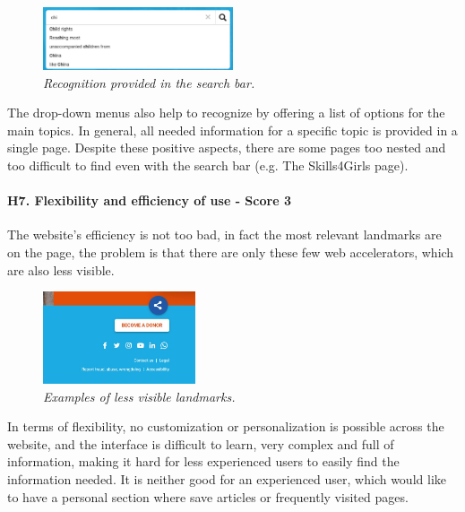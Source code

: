 \begin{figure}[!h]
	\begin{center}
		\includegraphics[width=0.5\textwidth]{FinalScores12.jpg}
		\captionsetup{font=small}
		\caption{\textit{Recognition provided in the search bar.}}
	\end{center}
\end{figure}
\newline The drop-down menus also help to recognize by offering a list of options for the main topics. 
\newline In general, all needed information for a specific topic is provided in a single page.
\newline Despite these positive aspects, there are some pages too nested and too difficult to find even with the search bar (e.g. The Skills4Girls page).
\newline
\newline \paragraph{H7. Flexibility and efficiency of use - Score 3} \label{subsec:H7}	The website's efficiency is not too bad, in fact the most relevant landmarks are on the page, the problem is that there are only these few web accelerators, which are also less visible.
\begin{figure}[!h]
	\begin{center}
		\includegraphics[width=0.4\textwidth]{FinalScores13.jpg}
		\captionsetup{font=small}
		\caption{\textit{Examples of less visible landmarks.}}
	\end{center}
\end{figure}
\newline In terms of flexibility, no customization or personalization is possible across the website, and the interface is difficult to learn, very complex and full of information, making it hard for less experienced users to easily find the information needed. It is neither good for an experienced user, which would like to have a personal section where save articles or frequently visited pages.

